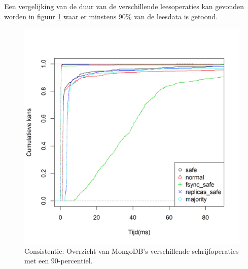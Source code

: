 Een vergelijking van de duur van de verschillende leesoperaties kan gevonden worden in figuur \ref{fig:consistentie-mongodb-all-mongodb-write} waar er minstens 90\% van de leesdata is getoond. 

\begin{figure}[htb!] 
	\centering
	\includegraphics[width=.42\textwidth]{img/Observaties/MongoDB/ECDF-Compare-Write-insert-1}
	\caption{Consistentie: Overzicht van MongoDB's verschillende schrijfoperaties met een 90-percentiel. }
	\label{fig:consistentie-mongodb-all-mongodb-write}
\end{figure}

